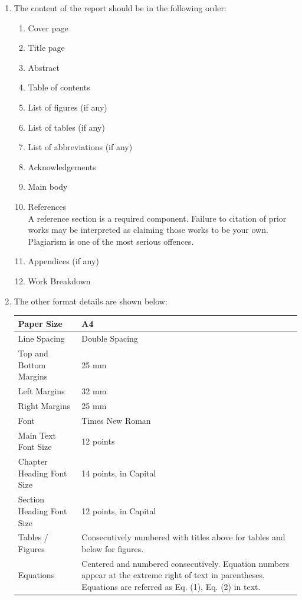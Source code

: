 \begin{enumerate}[nosep, leftmargin=*]
	\item The content of the report should be in the following order:
	\begin{enumerate}[nosep]
		\item Cover page
		\item Title page
		\item Abstract
		\item Table of contents
		\item List of figures (if any)
		\item List of tables (if any)
		\item List of abbreviations (if any)
		\item Acknowledgements
		\item Main body
		\item References \\
		A reference section is a required component. Failure to citation of prior works may be interpreted as claiming those works to be your own. Plagiarism is one of the most serious offences.
		\item Appendices (if any)
		\item Work Breakdown
	\end{enumerate}
	\vspace{1.5em}
	\item The other format details are shown below:
	\vspace{-0.5em}
	\begin{center}
		\renewcommand{\arraystretch}{1.2} %
		\begin{tabular}{|p{}|p{}|}
			\hline
			Paper Size & A4 \\
			\hline
			Line Spacing & Double Spacing \\
			\hline
			Top and Bottom Margins & 25 mm \\
			\hline
			Left Margins & 32 mm \\
			\hline
			Right Margins & 25 mm \\
			\hline
			Font & Times New Roman \\
			\hline
			Main Text Font Size & 12 points \\
			\hline
			Chapter Heading Font Size & 14 points, in Capital \\
			\hline
			Section Heading Font Size & 12 points, in Capital \\
			\hline
			Tables / Figures & Consecutively numbered with titles above for tables and below for figures. \\
			\hline
			Equations & Centered and numbered consecutively. Equation numbers appear at the extreme right of text in parentheses. Equations are referred as Eq. (1), Eq. (2) in text.  \\
			\hline
		\end{tabular}
	\end{center}
	

\end{enumerate}

